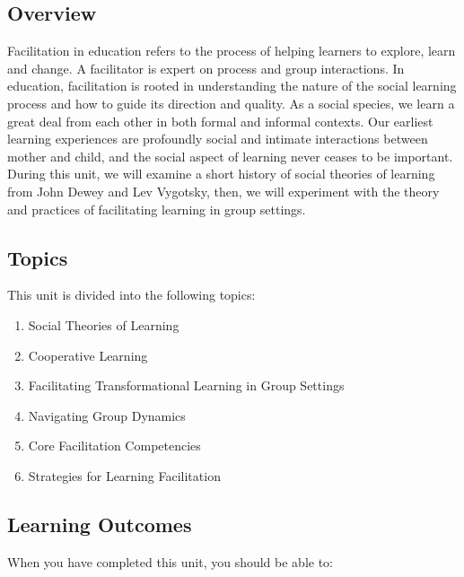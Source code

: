 \documentclass[
]{book}
\providecommand{\tightlist}{%
  \setlength{\itemsep}{0pt}\setlength{\parskip}{0pt}}
\begin{document}
\hypertarget{overview-2}{%
\subsection*{Overview}\label{overview-2}}

Facilitation in education refers to the process of helping learners to explore, learn and change. A facilitator is expert on process and group interactions. In education, facilitation is rooted in understanding the nature of the social learning process and how to guide its direction and quality. As a social species, we learn a great deal from each other in both formal and informal contexts. Our earliest learning experiences are profoundly social and intimate interactions between mother and child, and the social aspect of learning never ceases to be important. During this unit, we will examine a short history of social theories of learning from John Dewey and Lev Vygotsky, then, we will experiment with the theory and practices of facilitating learning in group settings.

\hypertarget{topics-2}{%
\subsection*{Topics}\label{topics-2}}

This unit is divided into the following topics:

\begin{enumerate}
\def\labelenumi{\arabic{enumi}.}
\tightlist
\item
  Social Theories of Learning
\item
  Cooperative Learning
\item
  Facilitating Transformational Learning in Group Settings
\item
  Navigating Group Dynamics
\item
  Core Facilitation Competencies
\item
  Strategies for Learning Facilitation
\end{enumerate}

\hypertarget{learning-outcomes-1}{%
\subsection*{Learning Outcomes}\label{learning-outcomes-1}}

When you have completed this unit, you should be able to:
\end{document}
